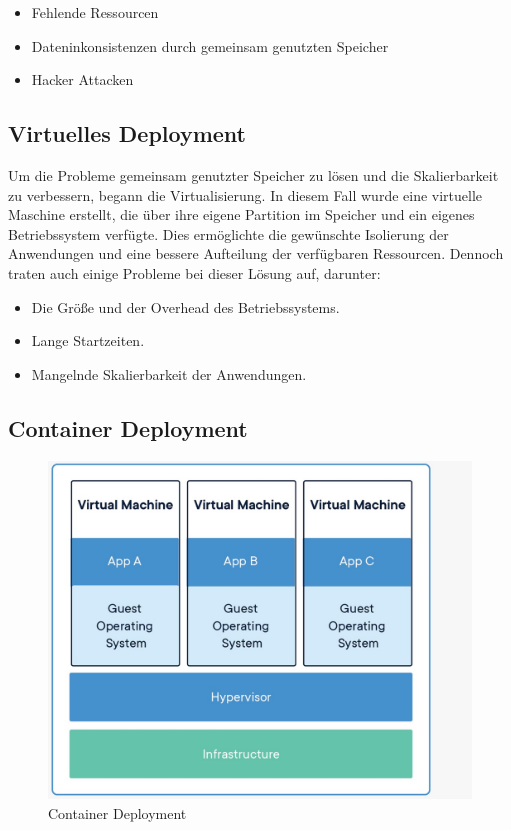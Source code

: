 \begin{itemize}
    \item Fehlende Ressourcen
    \item Dateninkonsistenzen durch gemeinsam genutzten Speicher
    \item Hacker Attacken
\end{itemize}


\cite{Verschiedene_Deployment_Arten}    


\subsection{Virtuelles Deployment}

Um die Probleme gemeinsam genutzter Speicher zu lösen und die Skalierbarkeit zu verbessern, begann die Virtualisierung. In diesem Fall wurde eine virtuelle Maschine erstellt, die über ihre eigene Partition im Speicher und ein eigenes Betriebssystem verfügte. Dies ermöglichte die gewünschte Isolierung der Anwendungen und eine bessere Aufteilung der verfügbaren Ressourcen. Dennoch traten auch einige Probleme bei dieser Lösung auf, darunter:

\begin{itemize}
\item Die Größe und der Overhead des Betriebssystems.
\item  Lange Startzeiten.
\item  Mangelnde Skalierbarkeit der Anwendungen.
\end{itemize}

\cite{Virtuelles_Deployment}

\subsection{Container Deployment}

\begin{figure}
    \centering
    \includegraphics[width=0.8\linewidth]{pics/container_deployment.jpeg}
    \caption{Container Deployment}
    \label{fig:enter-label}
\end{figure}


